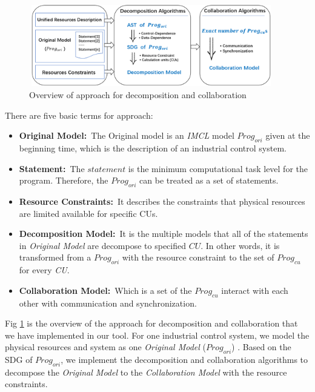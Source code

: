 

\begin{figure}[!hpbt]
    \centering
        \includegraphics[height=1.4in, width=4.2in]{fig_Approach}
    \caption{Overview of approach for decomposition and collaboration }\label{fig_approach}
\end{figure}

There are five basic terms for approach:
\begin{itemize}
  \item \textbf{Original Model:}\  The Original model is an \emph{IMCL} model $Prog_{ori}$ given at the beginning time, which is the description of an industrial control system.
  \item \textbf{Statement:}\ The $statement$ is the minimum computational task level for the program. Therefore, the $Prog_{ori}$ can be treated as a set of statements.
  \item \textbf{Resource Constraints:}\ It describes the constraints that physical resources are limited available for specific CUs.
  \item \textbf{Decomposition Model:}\  It is the multiple models that all of the statements in \emph{Original Model} are decompose to specified $CU$. In other words, it is transformed from a $Prog_{ori}$ with the resource constraint to the set of $Prog_{cu}$ for every \emph{CU}.
  \item \textbf{Collaboration Model:}\  Which is a set of the $Prog_{cu}$ interact with each other with communication and synchronization.
\end{itemize}

Fig \ref{fig_approach} is the overview of the approach for decomposition and collaboration that we have implemented in our tool. For one industrial control system, we model the physical resources and system as one \emph{Original Model} ($Prog_{ori}$) . Based on the SDG of $Prog_{ori}$, we implement the decomposition and collaboration algorithms to decompose the \emph{Original Model} to the \emph{Collaboration Model} with the resource constraints.

